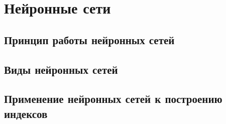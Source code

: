 \section{Нейронные сети}

\subsection{Принцип работы нейронных сетей}

\subsection{Виды нейронных сетей}

\subsection{Применение нейронных сетей к построению индексов}

